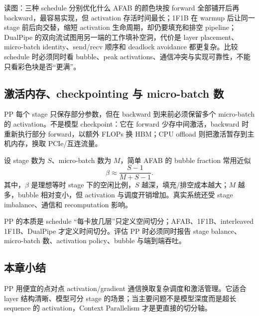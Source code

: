 

\begin{knowledgebox}{读图：三种 schedule 分别优化什么}
AFAB 的颜色块按 forward 全部铺开后再 backward，最容易实现，但 activation 存活时间最长；1F1B 在 warmup 后让同一 stage 前后向交替，缩短 activation 生命周期，却仍要填充和排空 pipeline；DualPipe 的双向流试图用另一端的工作填补空洞，代价是 layer placement、micro-batch identity、send/recv 顺序和 deadlock avoidance 都更复杂。比较 schedule 时必须同时看 bubble、peak activations、通信冲突与实现可靠性，不能只看彩色块是否“更满”。
\end{knowledgebox}


\subsection{激活内存、checkpointing 与 micro-batch 数}

PP 每个 stage 只保存部分参数，但在 backward 到来前必须保留多个 micro-batch 的 activation。不是模型 checkpoint：它在 forward 少存中间激活，backward 时重新执行部分 forward，以额外 FLOPs 换 HBM；CPU offload 则把激活暂存到主机内存，换取 PCIe/互连流量。


设 stage 数为 $S$、micro-batch 数为 $M$，简单 AFAB 的 bubble fraction 常用近似
\[
\beta\approx\frac{S-1}{M+S-1}.
\]
其中，$\beta$ 是理想等时 stage 下的空闲比例，$S$ 越深，填充/排空成本越大；$M$ 越多，bubble 相对变小，但 activation 与调度开销增加。真实系统还受 stage imbalance、通信和 recomputation 影响。

\begin{importantbox}{PP 的本质是 schedule}
“每卡放几层”只定义空间切分；AFAB、1F1B、interleaved 1F1B、DualPipe 才定义时间切分。评估 PP 时必须同时报告 stage balance、micro-batch 数、activation policy、bubble 与端到端吞吐。
\end{importantbox}

\subsection{本章小结}

PP 用便宜的点对点 activation/gradient 通信换取复杂调度和激活管理。它适合 layer 结构清晰、模型可分 stage 的场景；当主要问题不是模型深度而是超长 sequence 的 activation，Context Parallelism 才是更直接的切分轴。

